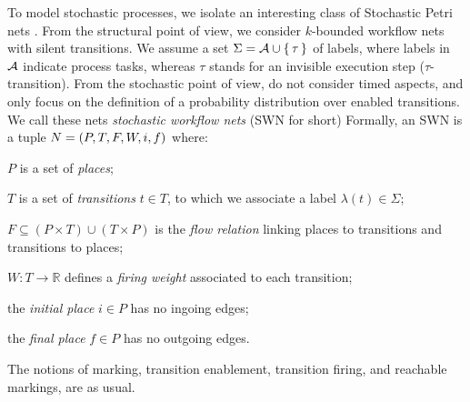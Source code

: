 To model stochastic processes, we isolate an interesting class of Stochastic Petri nets \cite{MarsanCB84,Desel1998,RoggeSoltiAW13}. From the structural point of view, we consider $k$-bounded workflow nets with silent transitions. We assume a set $\Sigma = \mathcal{A} \cup \set{\tau}$ of labels, where labels in $\mathcal{A}$ indicate process tasks, whereas $\tau$ stands for an invisible execution step ($\tau$-transition). %
From the stochastic point of view, do not consider timed aspects, and only focus on the definition of a probability distribution over enabled transitions. We call these nets \emph{stochastic workflow nets} (SWN for short)
Formally, an SWN is a tuple $N=(P,T,F,W,i,f)$ where:
\begin{mylist}
	\item $P$ is a set of \textit{places};
	\item $T$ is a set of \textit{transitions} $t\in T$, to which we associate a label $\lambda(t)\in\Sigma$;
	\item $F\subseteq (P\times T)\cup (T\times P)$ is the \emph{flow relation} linking places to transitions and transitions to places; %
	\item $W\colon T\to \mathbb{R}$ defines a \textit{firing weight} associated to each transition;
	\item the \emph{initial place} $i\in P$ has no ingoing edges; %
	\item the \emph{final place} $f\in P$ has no outgoing edges. %
\end{mylist}
The notions of marking, transition enablement, transition firing, and reachable markings, are as usual.

